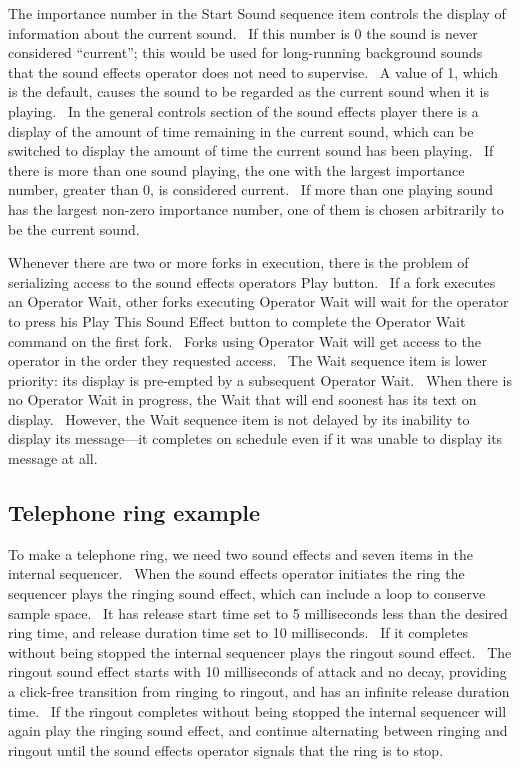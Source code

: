 \documentclass[letterpaper]{article}
\begin{document}
The importance number in the Start Sound sequence item controls the
display of information about the current sound. \ If this number is 0
the sound is never considered “current”; this would be used for
long-running background sounds that the sound effects operator does not
need to supervise. \ A value of 1, which is the default, causes the
sound to be regarded as the current sound when it is playing. \ In the
general controls section of the sound effects player there is a display
of the amount of time remaining in the current sound, which can be
switched to display the amount of time the current sound has been
playing. \ If there is more than one sound playing, the one with the
largest importance number, greater than 0, is considered current. \ If
more than one playing sound has the largest non-zero importance number,
one of them is chosen arbitrarily to be the current sound.

Whenever there are two or more forks in execution, there is the problem
of serializing access to the sound effects operator{\textquotesingle}s
Play button. \ If a fork executes an Operator Wait, other forks
executing Operator Wait will wait for the operator to press his Play
This Sound Effect button to complete the Operator Wait command on the
first fork. \ Forks using Operator Wait will get access to the operator
in the order they requested access. \ The Wait sequence item is lower
priority: its display is pre-empted by a subsequent Operator Wait.
\ When there is no Operator Wait in progress, the Wait that will end
soonest has its text on display. \ However, the Wait sequence item is
not delayed by its inability to display its message—it completes on
schedule even if it was unable to display its message at all.

\subsection[Telephone ring example]{Telephone ring example}
To make a telephone ring, we need two sound effects and seven items in
the internal sequencer. \ When the sound effects operator initiates the
ring the sequencer plays the ringing sound effect, which can include a
loop to conserve sample space. \ It has release start time set to 5
milliseconds less than the desired ring time, and release duration time
set to 10 milliseconds. \ If it completes without being stopped the
internal sequencer plays the ringout sound effect. \ The ringout sound
effect starts with 10 milliseconds of attack and no decay, providing a
click-free transition from ringing to ringout, and has an infinite
release duration time. \ If the ringout completes without being stopped
the internal sequencer will again play the ringing sound effect, and
continue alternating between ringing and ringout until the sound
effects operator signals that the ring is to stop.
\end{document}
